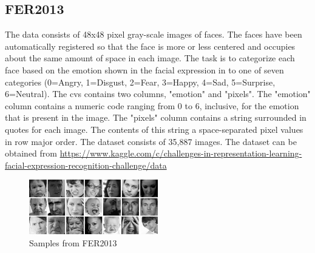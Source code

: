 \documentclass[11pt]{article}
\begin{document}
	\subsection{FER2013 \cite{carrier2013fer}}
	The data consists of 48x48 pixel gray-scale images of faces. The faces have been automatically registered so that the face is more or less centered and occupies about the same amount of space in each image. The task is to categorize each face based on the emotion shown in the facial expression in to one of seven categories (0=Angry, 1=Disgust, 2=Fear, 3=Happy, 4=Sad, 5=Surprise, 6=Neutral).
	\newline
	\newline
	The cvs contains two columns, "emotion" and "pixels". The "emotion" column contains a numeric code ranging from 0 to 6, inclusive, for the emotion that is present in the image. The "pixels" column contains a string surrounded in quotes for each image. The contents of this string a space-separated pixel values in row major order. The dataset consists of 35,887 images.
	\newline
	\newline
	The dataset can be obtained from
	\newline
	\def\UrlFont{\bfseries}
	\url{https://www.kaggle.com/c/challenges-in-representation-learning-facial-expression-recognition-challenge/data}
	\newline
	\newline
	\newline
	\newline
	\begin{figure}[ht]
		\centering
		\includegraphics[width=0.5\textwidth]{fer2013_images}
		\caption{Samples from FER2013}
	\end{figure}
	
	\newpage
	
\end{document}
